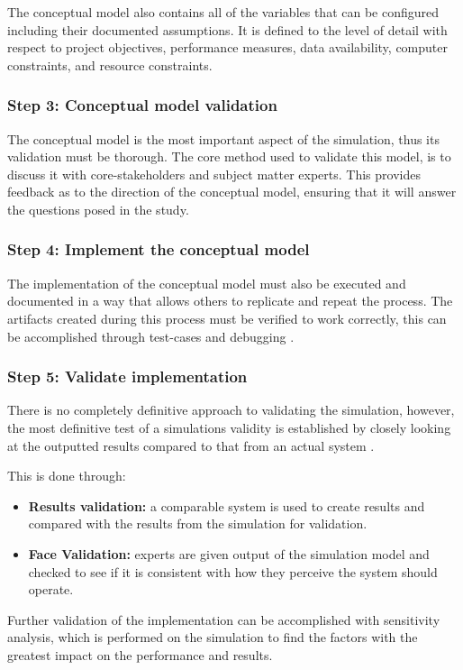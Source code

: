 The conceptual model also contains all of the variables that can be configured including their documented assumptions. 
It is defined to the level of detail with respect to project objectives, performance measures, data availability, computer constraints, and resource constraints.

\subsubsection{Step 3: Conceptual model validation}
The conceptual model is the most important aspect of the simulation, thus its validation must be thorough.
The core method used to validate this model, is to discuss it with core-stakeholders and subject matter experts.
This provides feedback as to the direction of the conceptual model, ensuring that it will answer the questions posed in the study.

\subsubsection{Step 4: Implement the conceptual model}
The implementation of the conceptual model must also be executed and documented in a way that allows others to replicate and repeat the process.
The artifacts created during this process must be verified to work correctly, this can be accomplished through test-cases and debugging \citep{Pressman1992}.

\subsubsection{Step 5: Validate implementation}
There is no completely definitive approach to validating the simulation,
however, the most definitive test of a simulations validity is established by closely looking at the outputted results compared to that from an actual system \citep{Law2005}.

This is done through:
\begin{itemize}
  \item \textbf{Results validation: } a comparable system is used to create results and compared with the results from the simulation for validation.
  \item \textbf{Face Validation: } experts are given output of the simulation model and checked to see if it is consistent with how they perceive the system should operate.
\end{itemize}

Further validation of the implementation can be accomplished with sensitivity analysis,
which is performed on the simulation to find the factors with the greatest impact on the performance and results.


